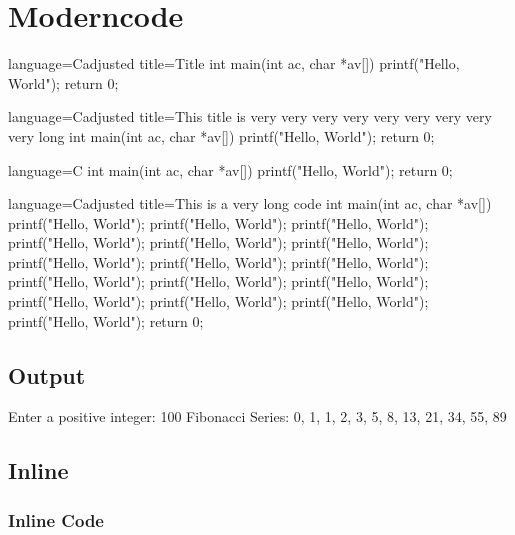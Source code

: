 \documentclass[10pt]{article}
\begin{document}
\section{Moderncode}

\begin{moderncode}{language=C}{adjusted title={Title}}
int main(int ac, char *av[])
{
    printf("Hello, World");
    return 0;
}
\end{moderncode}

\begin{moderncode}{language=C}{adjusted title={This title is very very very very very very very very very long}}
int main(int ac, char *av[])
{
    printf("Hello, World");
    return 0;
}
\end{moderncode}

\begin{moderncode}{language=C}{}
int main(int ac, char *av[])
{
    printf("Hello, World");
    return 0;
}
\end{moderncode}

\begin{moderncode}{language=C}{adjusted title={This is a very long code}}
int main(int ac, char *av[])
{
    printf("Hello, World");
    printf("Hello, World");
    printf("Hello, World");
    printf("Hello, World");
    printf("Hello, World");
    printf("Hello, World");
    printf("Hello, World");
    printf("Hello, World");
    printf("Hello, World");
    printf("Hello, World");
    printf("Hello, World");
    printf("Hello, World");
    printf("Hello, World");
    printf("Hello, World");
    printf("Hello, World");
    printf("Hello, World");
    return 0;
}
\end{moderncode}

\subsection{Output}

\begin{moderncodeout}{}{}
Enter a positive integer: 100
Fibonacci Series: 0, 1, 1, 2, 3, 5, 8, 13, 21, 34, 55, 89
\end{moderncodeout}

\subsection{Inline}

\subsubsection{Inline Code}
\end{document}
